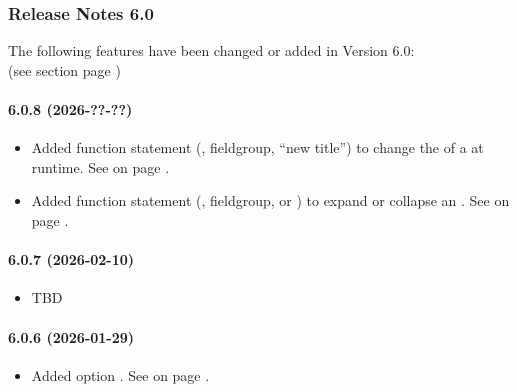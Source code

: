 \subsubsection{Release Notes 6.0}
\label{sec:releasenotes-6-0}
The following features have been changed or added in Version 6.0:\\


(see section  page \pageref{dia:setstatement})

\paragraph{6.0.8 (2026-??-??)}
\begin{itemize}
\item Added function statement \SET{}(\TITLE{}, fieldgroup, ``new title'')
      to change the \TITLE{} of a \FIELDGROUP{} at runtime.
      See  on page \pageref{dia:setstatement}.
\item Added function statement \SET{}(\EXPAND{}, fieldgroup, \TRUE{} or \FALSE{})
      to expand or collapse an \ACCORDION{} \FIELDGROUP.
      See  on page \pageref{dia:setstatement}.
\end{itemize}

\paragraph{6.0.7 (2026-02-10)}
\begin{itemize}
\item TBD
\end{itemize}

\paragraph{6.0.6 (2026-01-29)}
\begin{itemize}
\item Added \FIELDGROUP{} option \ACCORDION.
      See  on page \pageref{dia:uifieldgroupoption}.
\end{itemize}

